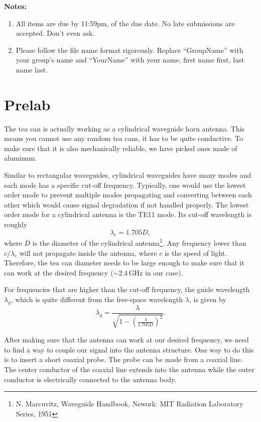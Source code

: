 \documentclass[letterpaper, 11pt]{article}
\begin{document}
\textbf{Notes:}
\begin{enumerate}
	\item All items are due by 11:59pm, of the due date. No late submissions are accepted. Don't even ask. 
	
	\item Please follow the file name format rigorously. Replace ``GroupName'' with your group's name and ``YourName'' with your name, first name first, last name last. 
\end{enumerate}


\section{Prelab}

The tea can is actually working as a cylindrical waveguide horn antenna. This means you cannot use any random tea cans, it has to be quite conductive. To make sure that it is also mechanically reliable, we have picked ones made of aluminum. 

Similar to rectangular waveguides, cylindrical waveguides have many modes and each mode has a specific cut-off frequency. Typically, one would use the lowest order mode to prevent multiple modes propagating and converting between each other which would cause signal degradation if not handled properly. The lowest order mode for a cylindrical antenna is the TE11 mode. Its cut-off wavelength is roughly 
\[
\lambda_c = 1.705 D,
\]
where $D$ is the diameter of the cylindrical antenna\footnote{N. Marcuvitz, Waveguide Handbook, Nework: MIT Radiation Laboratory Series, 1951}. Any frequency lower than $c/\lambda_c$ will not propagate inside the antenna, where $c$ is the speed of light. Therefore, the tea can diameter needs to be large enough to make sure that it can work at the desired frequency ($\sim$2.4\,GHz in our case). 

For frequencies that are higher than the cut-off frequency, the guide wavelength $\lambda_g$, which is quite different from the free-space wavelength $\lambda$, is given by 
\[
	\lambda_g= \frac{\lambda}{\displaystyle \sqrt{1-\left( \frac{\lambda}{\displaystyle  1.705D} \right)^2}}.
\]

After making sure that the antenna can work at our desired frequency, we need to find a way to couple our signal into the antenna structure. One way to do this is to insert a short coaxial probe. The probe can be made from a coaxial line. The center conductor of the coaxial line extends into the antenna while the outer conductor is electrically connected to the antenna body. 
\end{document}
